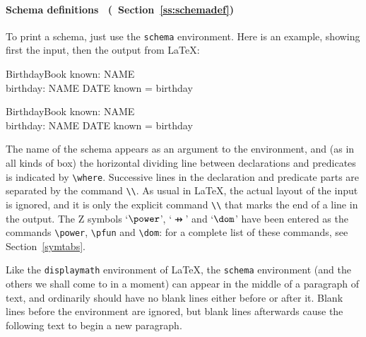 \paragraph{Schema definitions%
        \ifmanual\ \rm (\ZRM\ Section~\protect\ref{ss:schemadef})\fi}%
To print a schema, just use the \verb/schema/ environment. Here is
an example, showing first the input, then the output from
\LaTeX:
\begin{demo}
\begin{schema}{BirthdayBook}
    known: \power NAME \\
    birthday: NAME \pfun DATE
\where
    known = \dom birthday
\end{schema}
\gives
\begin{schema}{BirthdayBook}
    known: \power NAME \\
    birthday: NAME \pfun DATE
\where
    known = \dom birthday
\end{schema}
\end{demo}
The name of the schema appears as an argument to the environment,
and (as in all kinds of box) the horizontal dividing line between
declarations and predicates is indicated by
\verb/\where/\index{|\where|}.
Successive lines in the declaration and predicate parts are
separated by the command \verb/\\/.  As usual in
\LaTeX, the actual layout of the input is ignored, and it is only
the explicit command \verb/\\/ that marks the end of a line in the
output.  The Z symbols `$\power$', `$\pfun$' and
`$\dom$' have been entered as the commands \verb/\power/,
\verb/\pfun/ and \verb/\dom/: for a complete list of these commands,
see Section~\ref{symtabs}.

Like the \verb/displaymath/ environment of \LaTeX, the \verb/schema/
environment (and the others we shall come to in a moment) can appear
in the middle of a paragraph of text, and ordinarily should have no blank
lines either before or after it. Blank lines before the environment
are ignored, but blank lines afterwards cause the following text to
begin a new paragraph.


